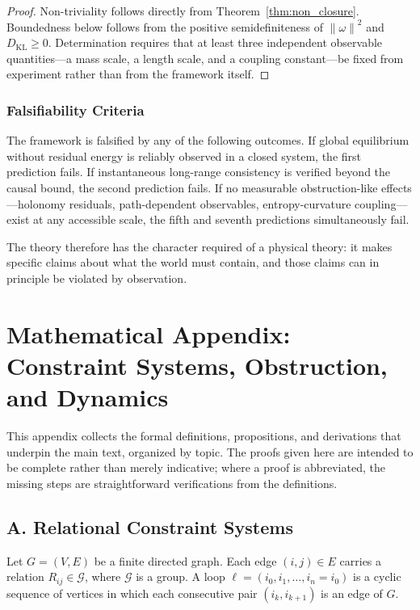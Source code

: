 \documentclass[12pt,a4paper,openany]{book}
\theoremstyle{plain}
\theoremstyle{definition}
\theoremstyle{remark}
\newcommand{\norm}[1]{\left\|#1\right\|}
\begin{document}
\begin{proof}
Non-triviality follows directly from Theorem~\ref{thm:non_closure}. Boundedness below follows from the positive semidefiniteness of $\norm{\omega}^2$ and $D_{\mathrm{KL}} \geq 0$. Determination requires that at least three independent observable quantities---a mass scale, a length scale, and a coupling constant---be fixed from experiment rather than from the framework itself.
\end{proof}

\subsection{Falsifiability Criteria}

The framework is falsified by any of the following outcomes. If global equilibrium without residual energy is reliably observed in a closed system, the first prediction fails. If instantaneous long-range consistency is verified beyond the causal bound, the second prediction fails. If no measurable obstruction-like effects---holonomy residuals, path-dependent observables, entropy-curvature coupling---exist at any accessible scale, the fifth and seventh predictions simultaneously fail.

The theory therefore has the character required of a physical theory: it makes specific claims about what the world must contain, and those claims can in principle be violated by observation.
\backmatter

\chapter*{Mathematical Appendix: Constraint Systems, Obstruction, and Dynamics}

This appendix collects the formal definitions, propositions, and derivations that underpin the main text, organized by topic. The proofs given here are intended to be complete rather than merely indicative; where a proof is abbreviated, the missing steps are straightforward verifications from the definitions.

\section*{A. Relational Constraint Systems}

Let $G = (V, E)$ be a finite directed graph. Each edge $(i, j) \in E$ carries a relation $R_{ij} \in \mathcal{G}$, where $\mathcal{G}$ is a group. A loop $\ell = (i_0, i_1, \ldots, i_n = i_0)$ is a cyclic sequence of vertices in which each consecutive pair $(i_k, i_{k+1})$ is an edge of $G$.
\end{document}
